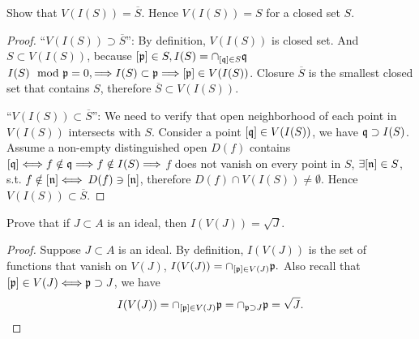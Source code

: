 \documentclass[11pt,fleqn]{book}
\begin{document}
\begin{exr}
Show that $V(I(S)) = \overline{S}$. Hence $V(I(S)) = S$ for a closed set $S$.
\end{exr}
\begin{proof}
``$V(I(S))\supset \overline{S}$'':
By definition, $V(I(S))$ is closed set. And $S\subset V(I(S))$, because $[{\mathfrak p}]\in S, I(S)=\cap_{[\mathfrak q]\in S}\mathfrak q$ $I(S)\mod {{\mathfrak p}}=0,\Longrightarrow I(S)\subset {\mathfrak p}\Longrightarrow [{\mathfrak p}]\in V(I(S))$. Closure $\overline{S}$ is the smallest closed set that contains $S$, therefore $\overline{S}\subset V(I(S))$.

 ``$V(I(S))\subset \overline{S}$'': We need to verify that open neighborhood of each point in $V(I(S))$ intersects with $S$. Consider a point $[\mathfrak q]\in V(I(S))$, we have $\mathfrak q\supset I(S)$. Assume  a non-empty distinguished open $D(f)$ contains $[\mathfrak q]\Longleftrightarrow f\notin\mathfrak q \Longrightarrow f\notin I(S)\Longrightarrow$ $f $ does not vanish on every point in $S$, $\exists[{\mathfrak n}]\in S$, s.t. $f\notin [{\mathfrak n}]\Longleftrightarrow$ $D(f)\ni [{\mathfrak n}]$, therefore $D(f)\cap V(I(S))\neq \emptyset$. Hence $V(I(S))\subset \overline{S}$.
\end{proof}

\begin{exr}
Prove that if $J \subset A$ is an ideal, then $I(V(J)) = \sqrt J$.
\end{exr}
\begin{proof}
Suppose $J\subset A$ is an ideal. By definition, $I(V(J))$ is the set of functions that vanish on $V(J)$, 
$
I(V(J))=\cap_{[{\mathfrak p}]\in V(J)}{\mathfrak p}.
$
Also recall that $[{\mathfrak p}]\in V(J)\Longleftrightarrow{\mathfrak p}\supset J$, we have
$$
I(V(J))=\cap_{[{\mathfrak p}]\in V(J)}{\mathfrak p}=\cap_{{\mathfrak p}\supset J}{\mathfrak p}=\sqrt J.
$$
\end{proof}
\end{document}
